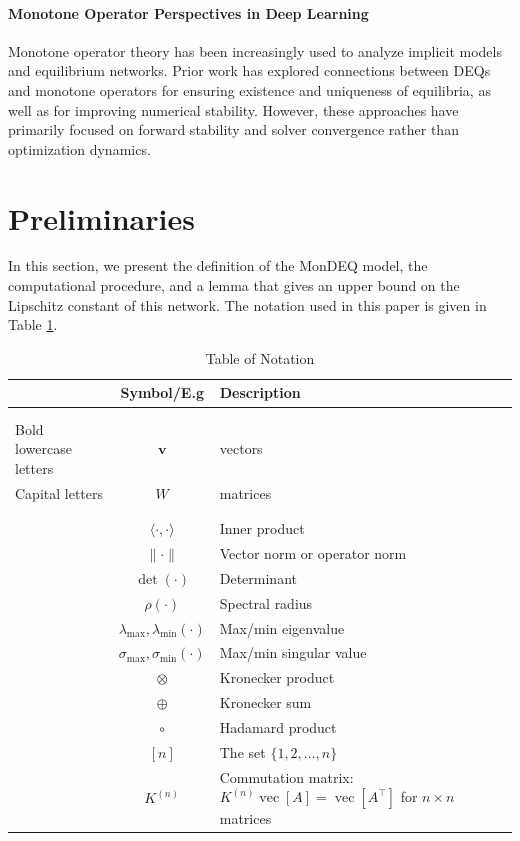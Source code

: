 \documentclass[twoside]{article}
\begin{document}
\paragraph{Monotone Operator Perspectives in Deep Learning}
Monotone operator theory has been increasingly used to analyze implicit models and equilibrium networks. Prior work has explored connections between DEQs and monotone operators for ensuring existence and uniqueness of equilibria, as well as for improving numerical stability. However, these approaches have primarily focused on forward stability and solver convergence rather than optimization dynamics.

\section{Preliminaries}

In this section, we present the definition of the MonDEQ model, the computational procedure, and a lemma that gives an upper bound on the Lipschitz constant of this network. The notation used in this paper is given in Table \ref{tab:TableOfNotationForMyResearch}.


\begin{table}[ht]
\caption{Table of Notation}
\centering
\begin{tabularx}{\columnwidth}{>{\raggedleft\arraybackslash}p{1.5cm} c X}
\toprule
& \textbf{Symbol/E.g} & \textbf{Description}\\
\midrule\midrule
\multicolumn{3}{c}{\textbf{Variables}}\\
\\
Bold lowercase letters  & $\mathbf{v}$ & vectors \\
Capital letters & $W$ & matrices \\
\midrule\midrule
\multicolumn{3}{c}{\textbf{Operators}}\\
\\
& $\langle\cdot, \cdot\rangle$ & Inner product\\
& $\|\cdot\|$ & Vector norm or operator norm\\
& $\det(\cdot)$ & Determinant\\
& $\rho(\cdot)$ & Spectral radius\\
& $\lambda_{\max}, \lambda_{\min}(\cdot)$ & Max/min eigenvalue\\
& $\sigma_{\max}, \sigma_{\min}(\cdot)$ & Max/min singular value\\
& $\otimes$ & Kronecker product \\
& $\oplus$ & Kronecker sum \\
& $\circ$ & Hadamard product \\
& $[n]$ & The set $\{1, 2, \dots, n\}$ \\
& $K^{(n)}$ & Commutation matrix: $K^{(n)}\operatorname{vec}[A] = \operatorname{vec}[A^\top]$ for $n \times n$ matrices \\ 
\bottomrule
\end{tabularx}
\label{tab:TableOfNotationForMyResearch}
\end{table}
\end{document}
